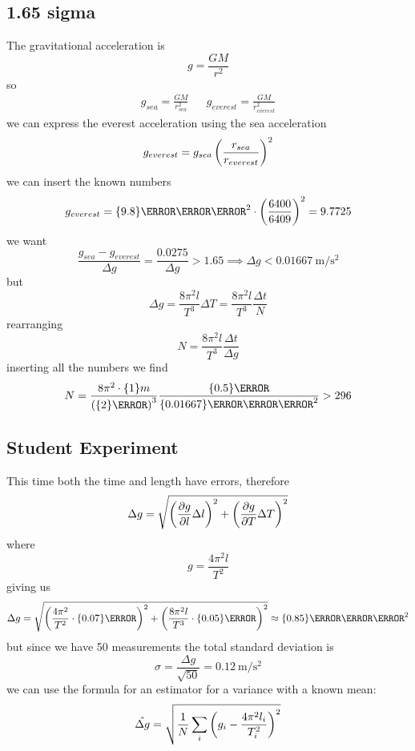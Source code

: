 \subsection{1.65 sigma}
The gravitational acceleration is
\begin{equation}
    g = \frac{GM}{r^2}
\end{equation}
so 
\begin{align}
    g_{sea} = \frac{GM}{r_{sea}^2} && g_{everest} = \frac{GM}{r_{everest}^2}
\end{align}
we can express the everest acceleration using the sea acceleration
\begin{equation}
    g_{everest} = g_{sea}\left(\frac{r_{sea}}{r_{everest}}\right)^2
\end{equation}
we can insert the known numbers
\begin{equation}
    g_{everest} = \qty{9.8}{\meter\per\second^2}\cdot\ins{\frac{6400}{6409}}^2 = 9.7725
\end{equation}
we want 
\begin{equation}
    \frac{g_{sea}-g_{everest}}{\Delta g} = \frac{0.0275}{\Delta g} > 1.65 \implies \Delta g < \qty{0.01667}{\meter\per\second^2}
\end{equation}
but
\begin{equation}
    \Delta g = \frac{8\pi^2l}{T^3}\Delta T =  \frac{8\pi^2l}{T^3}\frac{\Delta t}{N}
\end{equation}
rearranging
\begin{equation}
    N = \frac{8\pi^2l}{T^3}\frac{\Delta t}{\Delta g}
\end{equation}
inserting all the numbers we find
\begin{equation}
    N = \frac{8\pi^2\cdot\qty{1}{m}}{\ins{\qty{2}{\second}}^3}\frac{\qty{0.5}{\second}}{\qty{0.01667}{\meter\per\second^2}} > 296
\end{equation}
\subsection{Student Experiment}
This time both the time and length have errors, therefore
\begin{equation}
    \Delta g  =\sqrt{\left(\pdv{g}{l}\Delta l\right)^2+\left(\pdv{g}{T}\Delta T\right)^2}
\end{equation}
where
\begin{equation}
    g = \frac{4\pi^2l}{T^2}
\end{equation}
giving us 
\begin{equation}
    \Delta g = \sqrt{\ins{\frac{4\pi^2}{T^2}\cdot\qty{0.07}{\meter}}^2+\ins{\frac{8\pi^2l}{T^3}\cdot\qty{0.05}{\second}}^2} \approx \qty{0.85}{\meter\per\second^2}
\end{equation}
but since we have 50 measurements the total standard deviation is
\begin{equation}
    \sigma = \frac{\Delta g}{\sqrt{50}} = \qty{0.12}{\meter\per\second^2}
\end{equation}
we can use the formula for an estimator for a variance with a known mean:
\begin{equation}
    \hat{\Delta g} = \sqrt{\frac{1}{N}\sum_i\left(g_i-\frac{4\pi^2l_i}{T_i^2}\right)^2}
\end{equation}
